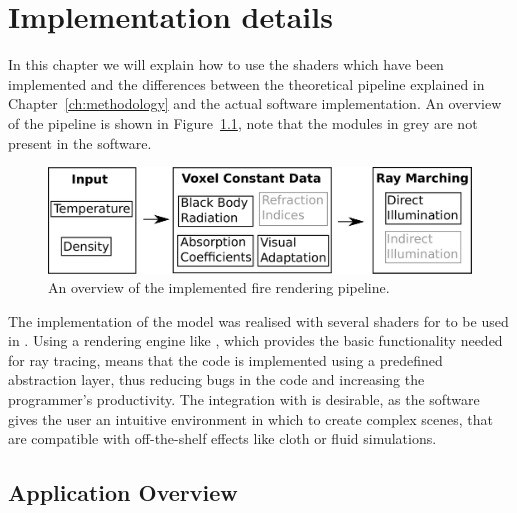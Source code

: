\chapter{Implementation details}
\label{ch:implementation_details}

In this chapter we will explain how to use the shaders which have been implemented and the differences between the theoretical pipeline explained in Chapter~\ref{ch:methodology} and the actual software implementation.
An overview of the pipeline is shown in Figure~\ref{fig:pipeline_simplified}, note that the modules in grey are not present in the software.

\begin{figure}[htbp!]
	\centering
	\includegraphics[width=\textwidth]{img/pipeline_simplified}
	\caption{An overview of the implemented fire rendering pipeline.}
	\label{fig:pipeline_simplified}
\end{figure}

The implementation of the model was realised with several shaders for \MentalRay to be used in \Mayash.
Using a rendering engine like \MentalRaysh, which provides the basic functionality needed for ray tracing, means that the code is implemented using a predefined abstraction layer, thus reducing bugs in the code and increasing the programmer's productivity.
The integration with \Maya is desirable, as the software gives the user an intuitive environment in which to create complex scenes, that are compatible with off-the-shelf effects like cloth or fluid simulations. 

\section{Application Overview}
\label{sec:application_overview}

